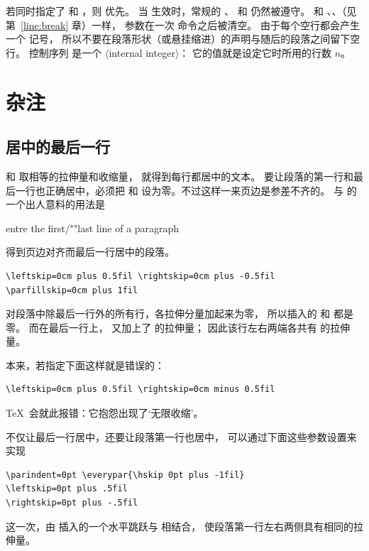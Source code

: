 \documentclass[a4paper]{rapport3}
\def\gr#1{$\langle$#1$\rangle$}\def\key#1{{\tt#1}}
\def\alt{}\def\altt{}%
\def\howto#1\par{}
\begin{document}
若同时指定了  和 ，则  优先。
当  生效时，常规的 、
和  仍然被遵守。
和 、、（见第~\ref{line:break} 章）一样，
 参数在一次  命令之后被清空。
由于每个空行都会产生一个  记号，
所以不要在段落形状（或悬挂缩进）的声明与随后的段落之间留下空行。
控制序列\alt {} 是一个 \gr{internal integer}：
它的值就是设定它时所用的行数 $n$。

\section{杂注}

\subsection{居中的最后一行}

 和  取相等的拉伸量和收缩量，
就得到每行都居中的文本。
要让段落的第一行和最后一行也正确居中，必须把  和
 设为零。不过这样一来页边是参差不齐的。
 与  的一个出人意料的用法是
\mdqon
\howto Centre the first/""last line of a paragraph\par
\mdqoff
得到页边对齐而最后一行居中的段落。
\begin{verbatim}
\leftskip=0cm plus 0.5fil \rightskip=0cm plus -0.5fil
\parfillskip=0cm plus 1fil
\end{verbatim}

对段落中除最后一行外的所有行，各拉伸分量加起来为零，
所以插入的  和  都是零。
而在最后一行上， 又加上了 \hbox{} 的拉伸量；
因此该行左右两端各共有 \hbox{} 的拉伸量。

本来，若指定下面这样就是错误的：
\begin{verbatim}
\leftskip=0cm plus 0.5fil \rightskip=0cm minus 0.5fil
\end{verbatim}
\TeX\ 会就此报错：它抱怨出现了`无限收缩'。

不仅让最后一行居中，还要让段落第一行也居中，
可以通过下面这些参数设置来实现
\begin{verbatim}
\parindent=0pt \everypar{\hskip 0pt plus -1fil}
\leftskip=0pt plus .5fil
\rightskip=0pt plus -.5fil
\end{verbatim}
这一次，由  插入的一个水平跳跃与  相结合，
使段落第一行左右两侧具有相同的拉伸量。
\end{document}
